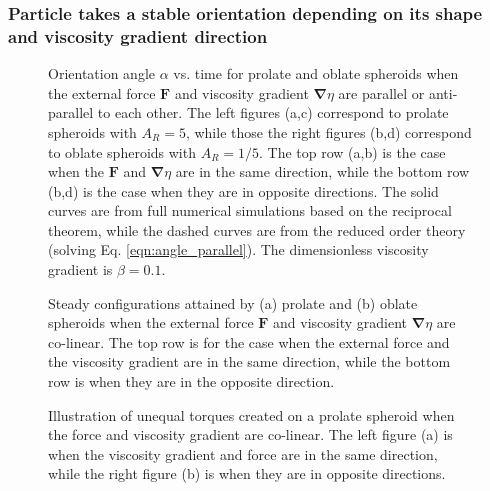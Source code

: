 \documentclass{jfm}
\begin{document}
\subsubsection{Particle takes a stable orientation depending on its shape and viscosity gradient direction}

\begin{figure}
\centering
{}
\hfill
{}
\caption{Orientation angle $\alpha$ vs. time for prolate and oblate spheroids when the external force $\boldsymbol{F}$ and viscosity gradient $\boldsymbol{\nabla} \eta$ are parallel or anti-parallel to each other.  The left figures (a,c) correspond to prolate spheroids with $A_R =5$, while those the right figures (b,d) correspond to oblate spheroids with $A_R =1/5$.  The top row (a,b) is the case when the $\boldsymbol{F}$ and $\boldsymbol{\nabla }\eta$ are in the same direction, while the bottom row (b,d) is the case when they are in opposite directions.  The solid curves are from full numerical simulations based on the reciprocal theorem, while the dashed curves are from the reduced order theory (solving Eq. \eqref{eqn:angle_parallel}).  The dimensionless viscosity gradient is $\beta = 0.1$.}
\label{fig:Orient_X}
\end{figure}



\begin{figure}
\centering
{}
\caption{Steady configurations attained by (a) prolate and (b) oblate spheroids when the external force $\boldsymbol{F}$ and viscosity gradient $\boldsymbol{\nabla}\eta$ are co-linear. The top row is for the case when the external force and the viscosity gradient are in the same direction, while the bottom row is when they are in the opposite direction.}
\label{fig:Stability_X}
\end{figure}

\begin{figure}
\centering
{}
\hfill
{}

\caption{Illustration of unequal torques created on a prolate spheroid when the force and viscosity gradient are co-linear. The left figure (a) is when the viscosity gradient and force are in the same direction, while the right figure (b) is when they are in opposite directions. }
\label{fig:Schematic_Explanation_1}
\end{figure}
\end{document}
